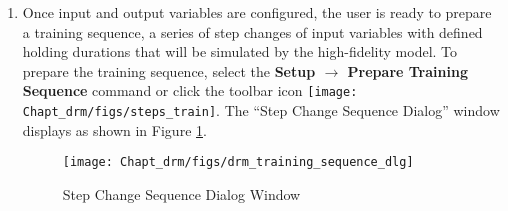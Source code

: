 \begin{enumerate}
	\item Once input and output variables are configured, the user is ready to prepare a training sequence, a series of step changes of input variables with defined holding durations that will be simulated by the high-fidelity model.  To prepare the training sequence, select the \textbf{Setup $\rightarrow$ Prepare Training Sequence} command or click the toolbar icon \texttt{[image: Chapt\_drm/figs/steps\_train]}.  The ``Step Change Sequence Dialog'' window displays as shown in Figure \ref{fig.drm_training_sequence_dlg}.
	\begin{figure}[H]
		\begin{center}
			\texttt{[image: Chapt\_drm/figs/drm\_training\_sequence\_dlg]}
			\caption{Step Change Sequence Dialog Window}
			\label{fig.drm_training_sequence_dlg}
		\end{center}
	\end{figure}

\end{enumerate}
